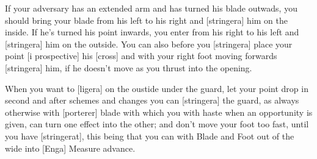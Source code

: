 \newpage


\newpage


If your adversary has an extended arm and has turned his blade
outwads, you should bring your blade from his left to his right and
[stringera] him on the inside. If he's turned his point inwards, you
enter from his right to his left and [stringera] him on the
outside. You can also before you [stringera] place your point [i
prospective] his [cross] and with your right foot moving forwards
[stringera] him, if he doesn't move as you thrust into the opening.

When you want to [ligera] on the oustide under the guard, let your
point drop in second and after schemes and changes you can [stringera]
the guard, as always otherwise with [porterer] blade with which you
with haste when an opportunity is given, can turn one effect into the
other; and don't move your foot too fast, until you have [stringerat],
this being that you can with Blade and Foot out of the wide into
[Enga] Measure advance.



